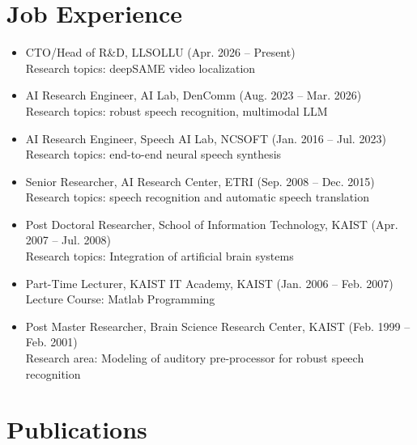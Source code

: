 \documentclass[11pt,a4paper]{article}
\begin{document}
\section*{Job Experience}
\begin{itemize}[leftmargin=*]
\item CTO/Head of R\&D, LLSOLLU (Apr. 2026 -- Present)\\
Research topics: deepSAME video localization
\item AI Research Engineer, AI Lab, DenComm (Aug. 2023 -- Mar. 2026)\\
Research topics: robust speech recognition, multimodal LLM 
\item AI Research Engineer, Speech AI Lab, NCSOFT (Jan. 2016 -- Jul. 2023)\\
Research topics: end-to-end neural speech synthesis
\item Senior Researcher, AI Research Center, ETRI (Sep. 2008 -- Dec. 2015)\\
Research topics: speech recognition and automatic speech translation 
\item Post Doctoral Researcher, School of Information Technology, KAIST (Apr. 2007 -- Jul. 2008)\\
Research topics: Integration of artificial brain systems 
\item Part-Time Lecturer, KAIST IT Academy, KAIST (Jan. 2006 -- Feb. 2007)\\
Lecture Course: Matlab Programming
\item Post Master Researcher, Brain Science Research Center, KAIST (Feb. 1999 -- Feb. 2001)\\
Research area: Modeling of auditory pre-processor for robust speech recognition
\end{itemize}

\section*{Publications}
\end{document}
